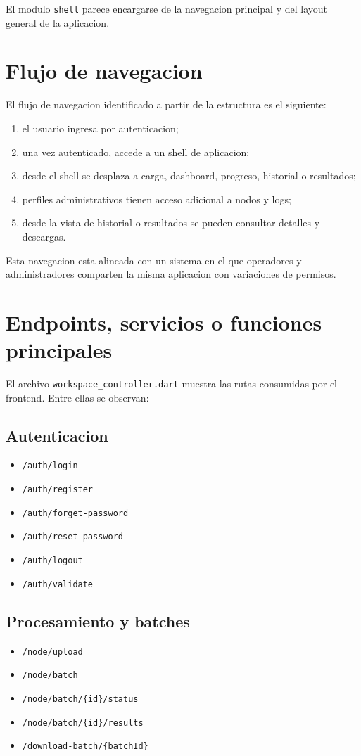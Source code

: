 \documentclass[conference]{IEEEtran}
\begin{document}
El modulo \texttt{shell} parece encargarse de la navegacion principal y del layout general de la aplicacion.

\section{Flujo de navegacion}
El flujo de navegacion identificado a partir de la estructura es el siguiente:

\begin{enumerate}[leftmargin=*]
\item el usuario ingresa por autenticacion;
\item una vez autenticado, accede a un shell de aplicacion;
\item desde el shell se desplaza a carga, dashboard, progreso, historial o resultados;
\item perfiles administrativos tienen acceso adicional a nodos y logs;
\item desde la vista de historial o resultados se pueden consultar detalles y descargas.
\end{enumerate}

Esta navegacion esta alineada con un sistema en el que operadores y administradores comparten la misma aplicacion con variaciones de permisos.

\section{Endpoints, servicios o funciones principales}
El archivo \texttt{workspace\_controller.dart} muestra las rutas consumidas por el frontend. Entre ellas se observan:

\subsection{Autenticacion}
\begin{itemize}[leftmargin=*]
\item \texttt{/auth/login}
\item \texttt{/auth/register}
\item \texttt{/auth/forget-password}
\item \texttt{/auth/reset-password}
\item \texttt{/auth/logout}
\item \texttt{/auth/validate}
\end{itemize}

\subsection{Procesamiento y batches}
\begin{itemize}[leftmargin=*]
\item \texttt{/node/upload}
\item \texttt{/node/batch}
\item \texttt{/node/batch/\{id\}/status}
\item \texttt{/node/batch/\{id\}/results}
\item \texttt{/download-batch/\{batchId\}}
\end{itemize}
\end{document}
